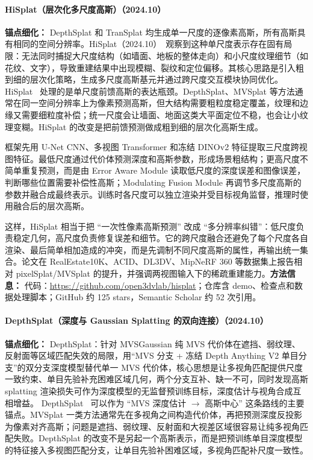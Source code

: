 \paragraph{HiSplat（层次化多尺度高斯）（2024.10）}
\textbf{锚点细化：} DepthSplat 和 TranSplat 均生成单一尺度的逐像素高斯，所有高斯具有相同的空间分辨率。HiSplat（2024.10）~\cite{2410_06245}观察到这种单尺度表示存在固有局限：无法同时捕捉大尺度结构（如墙面、地板的整体走向）和小尺度纹理细节（如花纹、文字），导致重建结果中出现模糊、裂纹和定位偏移。其核心思路是引入粗到细的层次化策略，生成多尺度高斯基元并通过跨尺度交互模块协同优化。
HiSplat~\cite{2410_06245} 处理的是单尺度前馈高斯的表达瓶颈。DepthSplat、MVSplat 等方法通常在同一空间分辨率上为像素预测高斯，但大结构需要粗粒度稳定覆盖，纹理和边缘又需要细粒度补偿；统一尺度会让墙面、地面这类大平面定位不稳，也会让小纹理变糊。HiSplat 的改变是把前馈预测做成粗到细的层次化高斯生成。

框架先用 U-Net CNN、多视图 Transformer 和冻结 DINOv2 特征提取三尺度跨视图特征。最低尺度通过代价体预测深度和高斯参数，形成场景粗结构；更高尺度不简单重复预测，而是由 Error Aware Module 读取低尺度的深度误差和图像误差，判断哪些位置需要补偿性高斯；Modulating Fusion Module 再调节多尺度高斯的参数并融合成最终表示。训练时各尺度可以独立渲染并受目标视角监督，推理时使用融合后的层次高斯。

这样，HiSplat 相当于把 ``一次性像素高斯预测'' 改成 ``多分辨率纠错''：低尺度负责稳定几何，高尺度负责修复误差和细节。它的跨尺度融合还避免了每个尺度各自渲染、最后简单相加造成的冲突，而是先调制不同尺度高斯的属性，再输出统一集合。论文在 RealEstate10K、ACID、DL3DV、MipNeRF 360 等数据集上报告相对 pixelSplat/MVSplat 的提升，并强调两视图输入下的稀疏重建能力。\textbf{方法信息：} 代码：\url{https://github.com/open3dvlab/hisplat}；仓库含 demo、检查点和数据处理脚本；GitHub 约 125 stars，Semantic Scholar 约 52 次引用。



\paragraph{DepthSplat（深度与 Gaussian Splatting 的双向连接）（2024.10）}
\textbf{锚点细化：} DepthSplat：针对 MVSGaussian 纯 MVS 代价体在遮挡、弱纹理、反射面等区域匹配失效的局限，用``MVS 分支 + 冻结 Depth Anything V2 单目分支''的双分支深度模型替代单一 MVS 代价体，核心思想是让多视角匹配提供尺度一致约束、单目先验补充困难区域几何，两个分支互补、缺一不可，同时发现高斯 splatting 渲染损失可作为深度模型的无监督预训练目标，深度估计与视角合成互相增益。
DepthSplat~\cite{2410_13862} 可以作为 ``MVS 深度估计 $\rightarrow$ 高斯中心'' 这条路线的主要锚点。MVSplat 一类方法通常先在多视角之间构造代价体，再把预测深度反投影为像素对齐高斯；问题是遮挡、弱纹理、反射面和大视差区域很容易让纯多视角匹配失败。DepthSplat 的改变不是另起一个高斯表示，而是把预训练单目深度模型的特征接入多视图匹配分支，让单目先验补困难区域，多视角匹配补尺度一致性。

